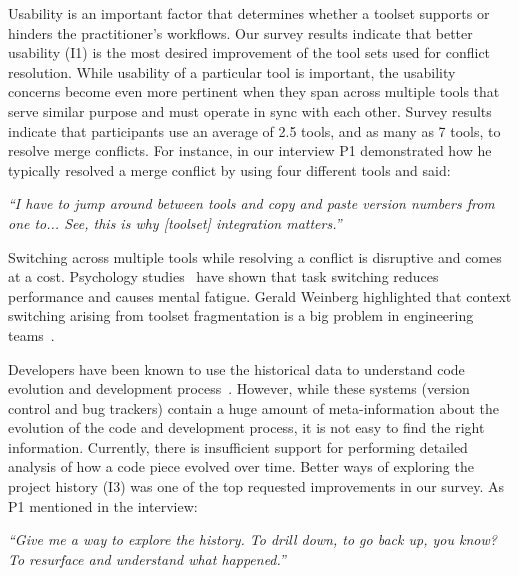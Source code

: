 Usability is an important factor that determines whether a toolset supports or hinders the practitioner's workflows.
Our survey results indicate that better usability (I1) is the most desired improvement of the tool sets used for conflict resolution. 
While usability of a particular tool is important, the usability concerns become even more pertinent when they span across multiple tools that serve similar purpose and must operate in sync with each other.
Survey results indicate that participants use an average of 2.5 tools, and as many as 7 tools, to resolve merge conflicts.
For instance, in our interview P1 demonstrated how he typically resolved a merge conflict by using four different tools and said: 
\begin{displayquote}
\textit{``I have to jump around between tools and copy and paste version numbers from one to... See, this is why [toolset] integration matters.''}
\end{displayquote}

Switching across multiple tools while resolving a conflict is disruptive and comes at a cost. Psychology studies~\cite{Meiran2000}\cite{gopher2000switching} have shown that task switching reduces performance and causes mental fatigue. 
Gerald Weinberg highlighted that context switching arising from toolset fragmentation is a big problem in engineering teams~\cite{Weinberg1992}. 


Developers have been known to use the historical data to understand code evolution and development process~\cite{Mihai_lenses}.
However, while these systems (version control and bug trackers) contain a huge amount of meta-information about the evolution of the code and development process, it is not easy to find the right information. Currently, there is insufficient support for performing detailed analysis of how a code piece evolved over time. Better ways of exploring the project history (I3) was one of the top requested improvements in our survey. As P1 mentioned in the interview:
\begin{displayquote}
\textit{``Give me a way to explore the history. To drill down, to go back up, you know? To resurface and understand what happened.''}
\end{displayquote}


